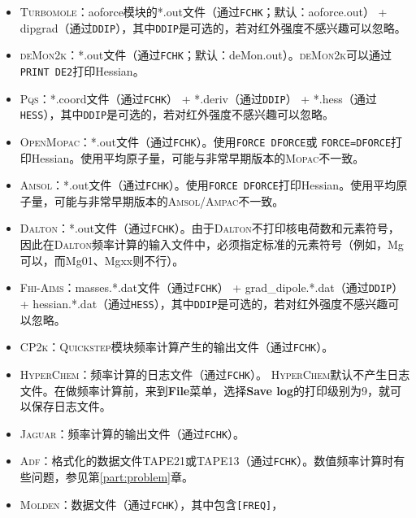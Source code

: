 \documentclass[12pt,a4paper,openany,twoside,cap,UTF8]{ctexbook}
\begin{document}
\begin{itemize}
\item \textsc{Turbomole}：aoforce模块的*.out文件（通过\verb|FCHK|；默认：aoforce.out） +
dipgrad（通过\verb|DDIP|），其中\verb|DDIP|是可选的，若对红外强度不感兴趣可以忽略。
\item \textsc{deMon2k}：*.out文件（通过\verb|FCHK|；默认：deMon.out）。\textsc{deMon2k}可以通过\texttt{PRINT DE2}打印Hessian。
\item \textsc{Pqs}：*.coord文件（通过\verb|FCHK|） + *.deriv（通过\verb|DDIP|） + *.hess（通过\verb|HESS|），其中\verb|DDIP|是可选的，若对红外强度不感兴趣可以忽略。
\item \textsc{OpenMopac}：*.out文件（通过\verb|FCHK|）。使用\texttt{FORCE DFORCE}或
\texttt{FORCE=DFORCE}打印Hessian。使用平均原子量，可能与非常早期版本的\textsc{Mopac}不一致。
\item \textsc{Amsol}：*.out文件（通过\verb|FCHK|）。使用\texttt{FORCE DFORCE}打印Hessian。使用平均原子量，可能与非常早期版本的\textsc{Amsol/Ampac}不一致。
\item \textsc{Dalton}：*.out文件（通过\verb|FCHK|）。由于\textsc{Dalton}不打印核电荷数和元素符号，因此在\textsc{Dalton}频率计算的输入文件中，必须指定标准的元素符号（例如，Mg可以，而Mg01、Mgxx则不行）。
\item \textsc{Fhi-Aims}：masses.*.dat文件（通过\verb|FCHK|） + grad{\_}dipole.*.dat（通过\verb|DDIP|） + hessian.*.dat（通过\verb|HESS|），其中\verb|DDIP|是可选的，若对红外强度不感兴趣可以忽略。
\item \textsc{CP2k}：\textsc{Quickstep}模块频率计算产生的输出文件（通过\verb|FCHK|）。
\item \textsc{HyperChem}：频率计算的日志文件（通过\verb|FCHK|）。
\textsc{HyperChem}默认不产生日志文件。在做频率计算前，来到\textbf{File}菜单，选择\textbf{Save log}的打印级别为9，就可以保存日志文件。
\item \textsc{Jaguar}：频率计算的输出文件（通过\verb|FCHK|）。
\item \textsc{Adf}：格式化的数据文件TAPE21或TAPE13（通过\verb|FCHK|）。数值频率计算时有些问题，参见第\ref{part:problem}章。
\item \textsc{Molden}：数据文件（通过\verb|FCHK|），其中包含\verb|[FREQ]|，

\end{itemize}
\end{document}
